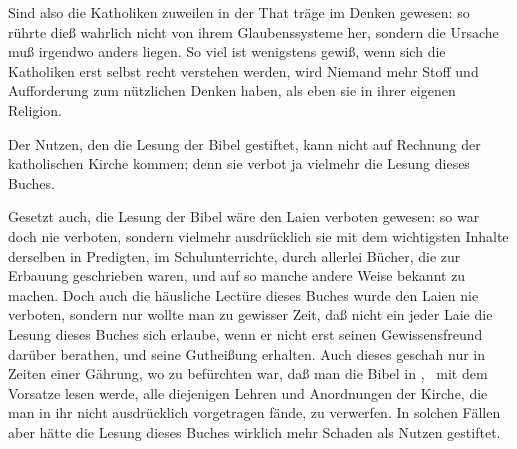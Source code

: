 \begin{aufza}
\item Sind also die Katholiken zuweilen in der That träge im Denken gewesen: so rührte dieß wahrlich nicht von ihrem Glaubenssysteme her, sondern die Ursache muß irgendwo anders liegen. So viel ist wenigstens gewiß, wenn sich die Katholiken erst selbst recht verstehen werden, wird Niemand mehr Stoff und Aufforderung zum nützlichen Denken haben, als eben sie in ihrer eigenen Religion.
\end{aufza}\par
{} Der Nutzen, den die Lesung der Bibel gestiftet, kann nicht auf Rechnung der katholischen Kirche kommen; denn sie verbot ja vielmehr die Lesung dieses Buches.\par
{} Gesetzt auch, die Lesung der Bibel wäre den Laien verboten gewesen: so war doch nie verboten, sondern vielmehr ausdrücklich  sie mit dem wichtigsten Inhalte derselben in Predigten, im Schulunterrichte, durch allerlei Bücher, die zur Erbauung geschrieben waren, und auf so manche andere Weise bekannt zu machen. Doch auch die häusliche Lectüre dieses Buches wurde den Laien nie  verboten, sondern nur wollte man zu gewisser Zeit, daß nicht ein jeder Laie die Lesung dieses Buches sich erlaube, wenn er nicht erst seinen Gewissensfreund darüber berathen, und seine Gutheißung erhalten. Auch dieses geschah nur in Zeiten einer Gährung, wo zu befürchten war, daß man die Bibel in , \dh\ mit dem Vorsatze lesen werde, alle diejenigen Lehren und Anordnungen der Kirche, die man in ihr nicht ausdrücklich vorgetragen fände, zu verwerfen. In solchen Fällen aber hätte die Lesung dieses Buches wirklich mehr Schaden als Nutzen gestiftet.~

